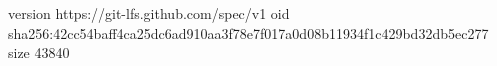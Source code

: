 version https://git-lfs.github.com/spec/v1
oid sha256:42cc54baff4ca25dc6ad910aa3f78e7f017a0d08b11934f1c429bd32db5ec277
size 43840
